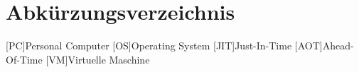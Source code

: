\chapter*{Abkürzungsverzeichnis}
\begin{acronym}
    [PC]{Personal Computer}
    [OS]{Operating System}
    [JIT]{Just-In-Time}
    [AOT]{Ahead-Of-Time}
    [VM]{Virtuelle Maschine}
    
\end{acronym}